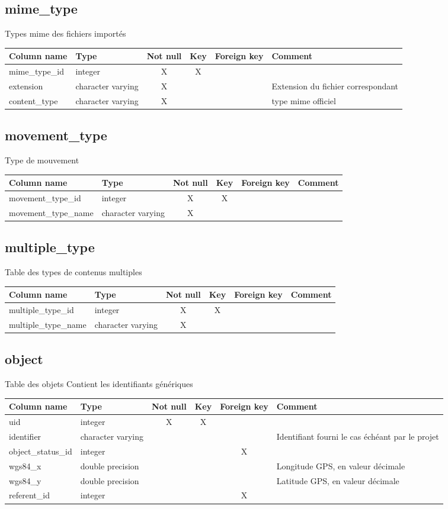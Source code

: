 \subsection{mime\_type}
Types mime des fichiers importés

\begin{tabular}{|l| p{2cm}|c|c|c| p{3cm}|}
\hline
Column name & Type & Not null & Key & Foreign key & Comment \\
\hline
mime\_type\_id & integer & X & X & & \\
\hline
extension & character varying & X & & & Extension du fichier correspondant\\
\hline
content\_type & character varying & X & & & type mime officiel\\
\hline
\end{tabular}
\subsection{movement\_type}
Type de mouvement

\begin{tabular}{|l| p{2cm}|c|c|c| p{3cm}|}
\hline
Column name & Type & Not null & Key & Foreign key & Comment \\
\hline
movement\_type\_id & integer & X & X & & \\
\hline
movement\_type\_name & character varying & X & & & \\
\hline
\end{tabular}
\subsection{multiple\_type}
Table des types de contenus multiples

\begin{tabular}{|l| p{2cm}|c|c|c| p{3cm}|}
\hline
Column name & Type & Not null & Key & Foreign key & Comment \\
\hline
multiple\_type\_id & integer & X & X & & \\
\hline
multiple\_type\_name & character varying & X & & & \\
\hline
\end{tabular}
\subsection{object}
Table des objets Contient les identifiants génériques

\begin{tabular}{|l| p{2cm}|c|c|c| p{3cm}|}
\hline
Column name & Type & Not null & Key & Foreign key & Comment \\
\hline
uid & integer & X & X & & \\
\hline
identifier & character varying & & & & Identifiant fourni le cas échéant par le projet\\
\hline
object\_status\_id & integer & & & X & \\
\hline
wgs84\_x & double precision & & & & Longitude GPS, en valeur décimale\\
\hline
wgs84\_y & double precision & & & & Latitude GPS, en valeur décimale\\
\hline
referent\_id & integer & & & X & \\
\hline
\end{tabular}

